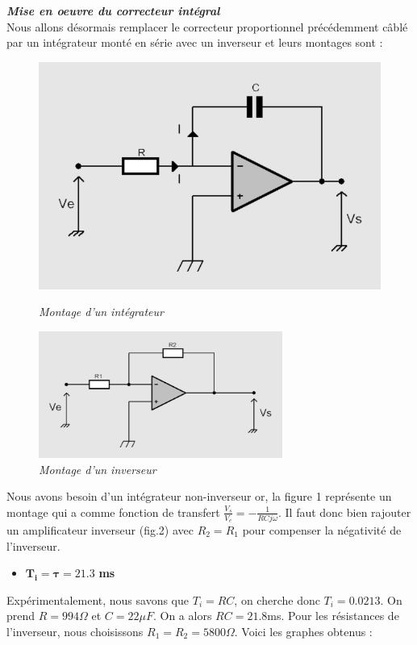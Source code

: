 \documentclass[12pt]{article}
\begin{document}
\newpage \Large \textit{\textbf{Mise en oeuvre du correcteur intégral}}
\\\normalsize Nous allons désormais remplacer le correcteur proportionnel précédemment câblé par un intégrateur monté en série avec un inverseur et leurs montages sont :
\begin{figure}[!ht]
    \centering
    \includegraphics[width = 8 cm]{TP3/integrateur.png}
    \caption{\itshape Montage d'un intégrateur}
    \includegraphics[width = 8cm]{TP3/inverseur.png}
    \caption{\itshape Montage d'un inverseur}
\end{figure}
\normalsize Nous avons besoin d'un intégrateur non-inverseur or, la figure 1 représente un montage qui a comme fonction de transfert $\frac{V_s}{V_e} = -\frac{1}{RCj\omega}$. Il faut donc bien rajouter un amplificateur inverseur (fig.2) avec $R_2=R_1$ pour compenser la négativité de l'inverseur.
\begin{itemize}
    \item \large $\mathbf{T_i = \tau = 21.3}$ \bf ms
\end{itemize}
Expérimentalement, nous savons que $T_i = RC$, on cherche donc $T_i = 0.0213$. On prend $R=994 \Omega$ et $C = 22 \mu F$. On a alors $RC = 21.8$ms.
Pour les résistances de l'inverseur, nous choisissons $R_1=R_2 = 5800 \Omega$. Voici les graphes obtenus : 
\end{document}
